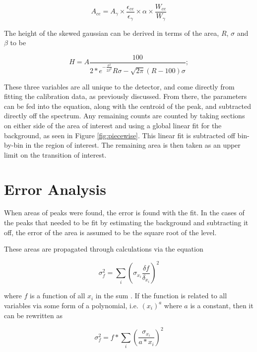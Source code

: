 \begin{equation}
    A_{ce} = A_{\gamma}\times\frac{\epsilon_{ce}}{\epsilon_{\gamma}}\times\alpha\times\frac{W_{ce}}{W_{\gamma}}
    \label{eq:subt_area_skew}
\end{equation}

The height of the skewed gaussian can be derived in terms of the area, $R$, $\sigma$ and $\beta$ to be

\begin{equation}
    H = A\frac{100}{2*e^{-\frac{\sigma^2}{2\beta^2}}R\sigma-\sqrt{2\pi}(R-100)\sigma};
    \label{eq:subt_height_skew}
\end{equation}

These three variables are all unique to the detector, and come directly from fitting the calibration data, as previously discussed. From there, the parameters can be fed into the equation, along with the centroid of the peak, and subtracted directly off the spectrum. Any remaining counts are counted by taking sections on either side of the area of interest and using a global linear fit for the background, as seen in Figure \ref{fig:piecewise}. This linear fit is subtracted off bin-by-bin in the region of interest. The remaining area is then taken as an upper limit on the transition of interest.



\section{Error Analysis}

When areas of peaks were found, the error is found with the fit. In the cases of the peaks that needed to be fit by estimating the background and subtracting it off, the error of the area is assumed to be the square root of the level.

These areas are propagated through calculations via the equation

\begin{equation}
    \sigma_{f}^2=\sum_{i}\left(\sigma_{x_i}\frac{\delta f}{\delta_{x_i}}\right)^2
\end{equation}

where $f$ is a function of all $x_i$ in the sum \citep{bevington03:_error}. If the function is related to all variables via some form of a polynomial, i.e. $(x_i)^a$ where $a$ is a constant, then it can be rewritten as

\begin{equation}
    \sigma_{f}^2=f*\sum_{i}\left(\frac{\sigma_{x_i}}{a*x_i}\right)^2
\end{equation}

